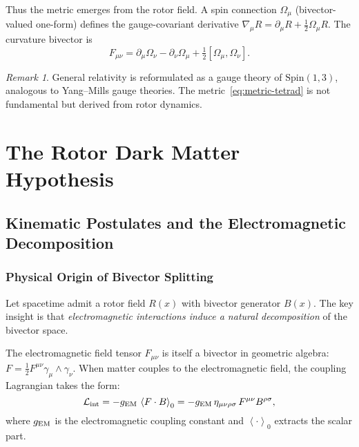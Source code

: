 \documentclass[11pt,a4paper]{article}
\numberwithin{equation}{section}
\theoremstyle{plain}
\theoremstyle{definition}
\theoremstyle{remark}
\newtheorem{remark}[theorem]{Remark}
\newcommand{\Spin}{\mathrm{Spin}}
\newcommand{\grade}[2]{\left\langle #1 \right\rangle_{#2}}
\newcommand{\Curv}{F_{\mu\nu}}              %
\newcommand{\Lag}{\mathcal{L}}              %
\begin{document}
Thus the metric emerges from the rotor field. A spin connection $\Omega_\mu$ (bivector-valued one-form) defines the gauge-covariant derivative $\nabla_\mu R=\partial_\mu R+\tfrac12 \Omega_\mu R$. The curvature bivector is
\begin{equation}
\Curv=\partial_\mu\Omega_\nu-\partial_\nu\Omega_\mu+\tfrac12[\Omega_\mu,\Omega_\nu].
\end{equation}

\begin{remark}
General relativity is reformulated as a gauge theory of $\Spin(1,3)$, analogous to Yang--Mills gauge theories. The metric~\eqref{eq:metric-tetrad} is not fundamental but derived from rotor dynamics.
\end{remark}

\vspace{1em}

\section{The Rotor Dark Matter Hypothesis}\label{sec:rotor-dm}

\subsection{Kinematic Postulates and the Electromagnetic Decomposition}

\subsubsection{Physical Origin of Bivector Splitting}

Let spacetime admit a rotor field $R(x)$ with bivector generator $B(x)$. The key insight is that \emph{electromagnetic interactions induce a natural decomposition} of the bivector space.

The electromagnetic field tensor $F_{\mu\nu}$ is itself a bivector in geometric algebra: $F=\tfrac12 F^{\mu\nu}\gamma_\mu\wedge\gamma_\nu$. When matter couples to the electromagnetic field, the coupling Lagrangian takes the form:
\begin{equation}
\Lag_{\rm int} = -g_{\rm EM}\,\grade{F\cdot B}{0} = -g_{\rm EM}\,\eta_{\mu\nu\rho\sigma}\,F^{\mu\nu}B^{\rho\sigma},
\label{eq:em-coupling}
\end{equation}
where $g_{\rm EM}$ is the electromagnetic coupling constant and $\grade{\cdot}{0}$ extracts the scalar part.
\end{document}
